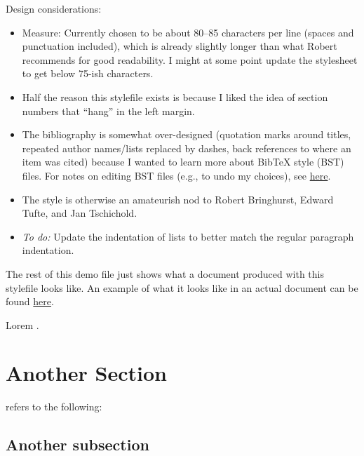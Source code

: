\documentclass[a4paper]{article}
\begin{document}
\noindent 
Design considerations:
\begin{itemize}
    \item Measure: Currently chosen to be about 80--85 characters per line (spaces and punctuation included), which is already slightly longer than what Robert \citeauthor{bringhurst1996elements} recommends for good readability. I might at some point update the stylesheet to get below 75-ish characters.
    \item Half the reason this stylefile exists is because I liked the idea of section numbers that ``hang'' in the left margin.
    \item The bibliography is somewhat over-designed (quotation marks around titles, repeated author names/lists replaced by dashes, back references to where an item was cited) because I wanted to learn more about BibTeX style (BST) files. For notes on editing BST files (e.g., to undo my choices), see \href{https://verenablaschke.github.io/blog/2023/bibtex-style-files/}{here}.
    \item The style is otherwise an amateurish nod to Robert Bringhurst, Edward Tufte, and Jan Tschichold.
    \item \textit{To do:} Update the indentation of lists to better match the regular paragraph indentation.
\end{itemize}

\noindent The rest of this demo file just shows what a document produced with this stylefile looks like.
An example of what it looks like in an actual document can be found \href{https://arxiv.org/pdf/2403.05902}{here}.

\lipsum[1]
Lorem \citep{doe2023example}.

\section{Another Section}
\label{sec:subtitled}
\citet{book1} refers to the following: \lipsum[2]

\subsection{Another subsection}
\lipsum[3-5]



\end{document}
